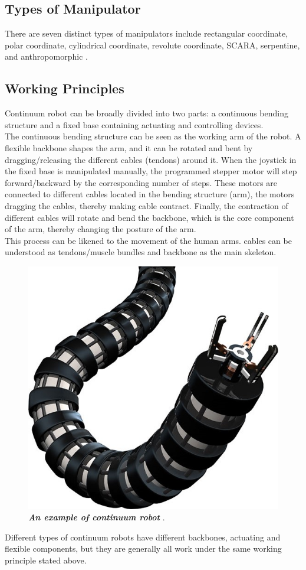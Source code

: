 \subsection{Types of Manipulator }
There are seven distinct types of manipulators include rectangular coordinate, polar coordinate, cylindrical 
coordinate, revolute coordinate, SCARA, serpentine, and anthropomorphic \cite{manipulators_types1,manipulators_types2}. 

\subsection{Working Principles}
Continuum robot can be broadly divided into two parts: a continuous bending structure and a fixed base containing actuating and 
controlling devices.\\
The continuous bending structure can be seen as the working arm of the robot. A flexible backbone shapes the arm, and it can be rotated 
and bent by dragging/releasing the different cables (tendons) around it. 
When the joystick in the fixed base is manipulated manually, the programmed stepper motor will step forward/backward by the 
corresponding number of steps. These motors are connected to different cables located in the bending structure (arm), the motors 
dragging the cables, thereby making cable contract. Finally, the contraction of different cables will rotate and bend the backbone, 
which is the core component of the arm, thereby changing the posture of the arm.\\
This process can be likened to the movement of the human arms. cables can be understood as tendons/muscle bundles and backbone as 
the main skeleton.
\begin{figure}[H] %
    \centering %
    \captionsetup{labelsep=colon}
    \includegraphics[width=.8\textwidth]{Image/LR/CR_example.jpg} 
    \caption[An example of continuum robot]
    {\centering \textit{\textbf{An example of continuum robot }}\cite{CR_example}.}
    \label{fig:CR_example}
\end{figure}
\noindent Different types of continuum robots have different backbones, actuating and flexible components, but they are generally all 
work under the same working principle stated above. \\
